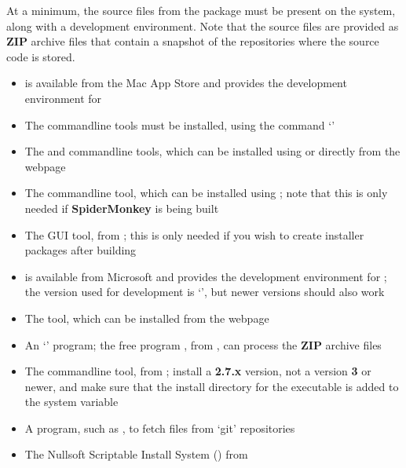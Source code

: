 At a minimum, the source files from the  package must be present on the
system, along with a  development environment.
Note that the source files are provided as \textbf{ZIP} archive files that contain a
snapshot of the  repositories where the source code is stored.
\tertiaryEnd
{}
\begin{itemize}
\item {} is available from the Mac App Store and provides the
 development environment for \mac{}
\item\exSp{}The  command\longDash{}line tools must be installed, using the
command `'
\item\exSp{}The  and  command\longDash{}line tools, which
can be installed using  or directly from the web\longDash{}page
\item\exSp{}The  command\longDash{}line tool, which can be installed
using ; note that this is only needed if \textbf{SpiderMonkey} is being
built
\item\exSp{}The  GUI tool, from
;
this is only needed if you wish to create installer packages after building \mplusm
\end{itemize}
\tertiaryEnd
{}
\begin{itemize}
\item {} is available from Microsoft and provides the 
development environment for \win; the version used for development is
`', but newer versions should also work
\item\exSp{}The  tool, which can be installed from the web\longDash{}page
\item\exSp{}An `' program; the free program , from
, can process the \textbf{ZIP} archive files
\item\exSp{}The  command\longDash{}line tool, from
; install a \textbf{2.7.x}
version, not a version \textbf{3} or newer, and make sure that the install directory for
the executable is added to the system  variable
\item\exSp{}A program, such as , to fetch files from `git' repositories
\item\exSp{}The Nullsoft Scriptable Install System () from
\end{itemize}
